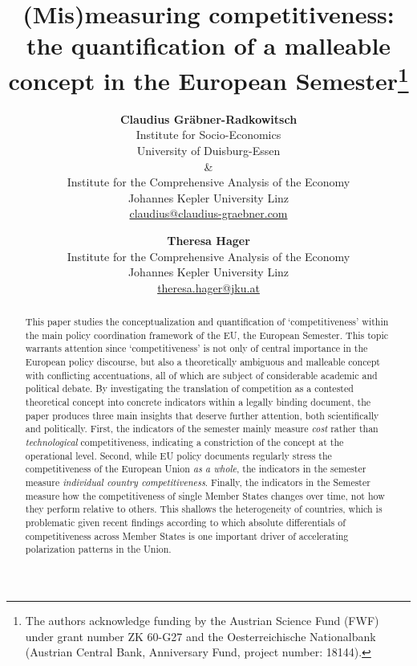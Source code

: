 \documentclass[
]{article}
\author{}
\date{\vspace{-2.5em}}
\begin{document}
\title{
  (Mis)measuring competitiveness: the quantification of a malleable concept in the European Semester\thanks{
    The authors acknowledge funding by the Austrian Science Fund (FWF) 
    under grant number ZK 60-G27 and the Oesterreichische Nationalbank 
    (Austrian Central Bank, Anniversary Fund, project number: 18144).}
}

\author{
  \textbf{Claudius Gräbner-Radkowitsch} \\
  Institute for Socio-Economics\\
  University of Duisburg-Essen\\
  \& \\
  Institute for the Comprehensive Analysis of the Economy\\
  Johannes Kepler University Linz\\
  \href{mailto:claudius@claudius-graebner.com}{claudius@claudius-graebner.com} \\
  \and
  \textbf{Theresa Hager}\\
  Institute for the Comprehensive Analysis of the Economy\\
  Johannes Kepler University Linz\\
  \href{mailto:theresa.hager@jku.at}{theresa.hager@jku.at} \\
}
\maketitle
\setcounter{footnote}{0}

\begin{abstract}
\small
This paper studies the conceptualization and quantification of 
`competitiveness’ within the main policy coordination framework 
of the EU, the European Semester. This topic warrants 
attention since `competitiveness' is not only of central importance in the European policy discourse, but also a theoretically ambiguous and malleable concept
with conflicting accentuations, all of which are subject of considerable 
academic and political debate. 
By investigating the translation of competition as a contested theoretical concept into 
concrete indicators within a legally binding document, the paper produces three main 
insights that deserve further attention, both scientifically and politically.
First, the indicators of the semester mainly measure \textit{cost} rather than 
\textit{technological} competitiveness, indicating a constriction of the 
concept at the operational level.
Second, while EU policy documents regularly stress the competitiveness of the 
European Union \textit{as a whole}, the indicators in the semester measure 
\textit{individual country competitiveness}.
Finally, the indicators in the Semester measure how the competitiveness of
single Member States changes over time, not how they perform relative to 
others. 
This shallows the heterogeneity of countries, which is problematic 
given recent findings according to which absolute differentials of
competitiveness across Member States is one important driver of accelerating 
polarization patterns in the Union.

\end{abstract}
\end{document}
